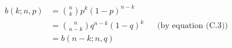 \liftdisplaystyle
\begin{align*}
    b(k;n,p) &= \binom{n}{k}p^k(1-p)^{n-k} \\
    &= \binom{n}{n-k}q^{n-k}(1-q)^k && \text{(by equation (C.3))} \\
    &= b(n-k;n,q)
\end{align*}
